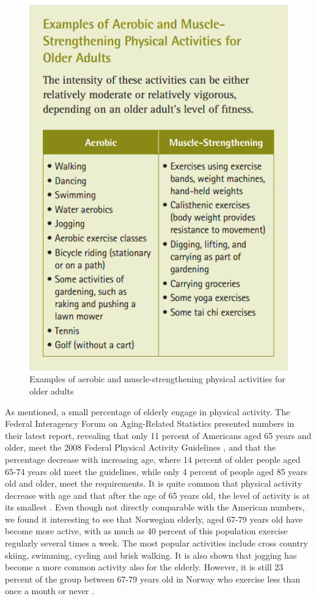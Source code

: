 \begin{figure}
\begin{center}
\includegraphics[scale=0.6]{typeofexercise}
\caption[Examples of aerobic and muscle-strengthening physical activities for 
older adults ]{Examples of aerobic and muscle-strengthening physical activities for 
older adults \cite{guidelines}}
\label{fig:typeofexercise}
\end{center}
\end{figure} 

As mentioned, a small percentage of elderly engage in physical activity. The Federal Interagency Forum on Aging-Related Statistics \cite{olderamericans} presented numbers in their latest report, revealing that only 11 percent of Americans aged 65 years and older, meet the 2008 Federal Physical Activity Guidelines \cite{guidelines}, and that the percentage decrease with increasing age, where 14 percent of older people aged 65-74 years old meet the guidelines, while only 4 percent of people aged 85 years old and older, meet the requirements.  It is quite common that physical activity decrease with age and that after the age of 65 years old, the level of activity is at its smallest \cite{schutzer}. Even though not directly comparable with the American numbers, we found it interesting to see that Norwegian elderly, aged  67-79 years old have become more active, with as much as 40 percent of this population exercise regularly several times a week. The most popular activities include cross country skiing, swimming, cycling and brisk walking. It is also shown that jogging has become a more common activity also for the elderly. However, it is still 23 percent of the group between 67-79 years old in Norway who exercise less than once a month or never \cite{statisticsnorway}.

